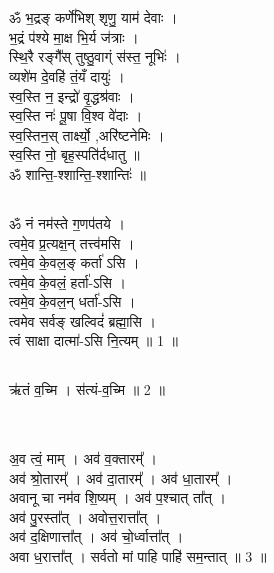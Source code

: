 \section{}
\subsection{}
ॐ भ॒द्रङ् कर्णे॑भिश् शृणु॒ याम॑ देवाः ।\\
भ॒द्रं प॑श्ये मा॒क्ष भि॒र्य ज॑त्राः ।\\
स्थि॒रै रङ्गै᳚स् तुष्ठु॒वाग्ं स॑स्त॒ नूभिः॑ ।\\
व्यशे॑म दे॒वहि॑ तं॒यँ दायुः॑ ।\\
स्व॒स्ति न॒ इन्द्रो॑ वृ॒द्धश्र॑वाः ।\\
स्व॒स्ति नः॑ पू॒षा वि॒श्व वे॑दाः ।\\
स्व॒स्तिन॒स् तार्क्ष्यो॒ ,अरि॑ष्टनेमिः ।\\
स्व॒स्ति नो॒ बृह॒स्पति॑र्दधातु ॥\\
ॐ शान्ति॒-श्शान्ति॒-श्शान्तिः॑ ॥\\
\subsection{}
ॐ नं नम॑स्ते ग॒णप॑तये ।\\
त्वमे॒व प्र॒त्यक्ष॒न् तत्त्व॑मसि ।\\
त्वमे॒व के॒वल॒ङ् कर्ता॑ ऽसि ।\\
त्वमे॒व के॒वलं॒ हर्ता॑-ऽसि ।\\
त्वमे॒व के॒वल॒न् धर्ता॑-ऽसि ।\\
त्वमेव सर्वङ् खल्विदं॑ ब्रह्मा॒सि ।\\
त्वं साक्षा दात्मा॑-ऽसि नि॒त्यम् ॥ 1 ॥\\
\subsection{}
ऋ॑तं व॒च्मि । स॑त्यं-व॒च्मि ॥ 2 ॥\\
\\
\subsection{}
अ॒व त्वं॒ माम् । अव॑ व॒क्तारम्᳚ ।\\
अव॑ श्रो॒तारम्᳚ । अव॑ दा॒तारम्᳚ । अव॑ धा॒तारम्᳚ ।\\
अवानू चा नम॑व शि॒ष्यम् । अव॑ प॒श्चात् ता᳚त् ।\\
अव॑ पु॒रस्ता᳚त् । अवोत्त॒रात्ता᳚त् ।\\
अव॑ द॒क्षिणात्ता᳚त् । अव॑ चो॒र्ध्वात्ता᳚त् ।\\
अवा ध॒रात्ता᳚त् । सर्वतो मां पाहि पाहि॑ सम॒न्तात् ॥  3 ॥\\
